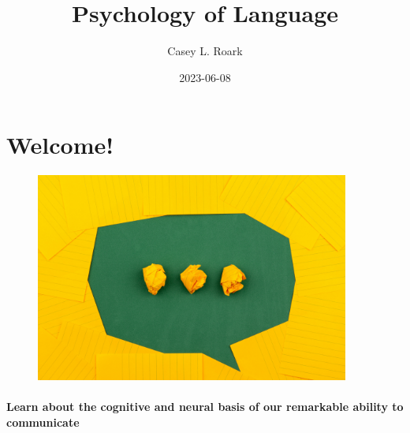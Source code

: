 \documentclass[
  letterpaper,
  DIV=11,
  numbers=noendperiod]{scrreprt}
\title{Psychology of Language}
\author{Casey L. Roark}
\date{2023-06-08}
\renewcommand*\contentsname{Table of contents}
\newcommand\contentsname{Table of contents}
\begin{document}
\maketitle
\ifdefined\Shaded\renewenvironment{Shaded}{\begin{tcolorbox}[frame hidden, enhanced, borderline west={3pt}{0pt}{shadecolor}, boxrule=0pt, interior hidden, breakable, sharp corners]}{\end{tcolorbox}}\fi

\renewcommand*\contentsname{Table of contents}
{
\hypersetup{linkcolor=}
\setcounter{tocdepth}{2}
\tableofcontents
}

\hypertarget{welcome}{%
\chapter*{Welcome!}\label{welcome}}


\begin{figure}

{\centering \includegraphics[width=4.0625in,height=\textheight]{images/volodymyr-hryshchenko-V5vqWC9gyEU-unsplash.jpg}

}

\end{figure}

\hypertarget{learn-about-the-cognitive-and-neural-basis-of-our-remarkable-ability-to-communicate}{%
\subsubsection*{Learn about the cognitive and neural basis of our
remarkable ability to
communicate}\label{learn-about-the-cognitive-and-neural-basis-of-our-remarkable-ability-to-communicate}}
\end{document}
